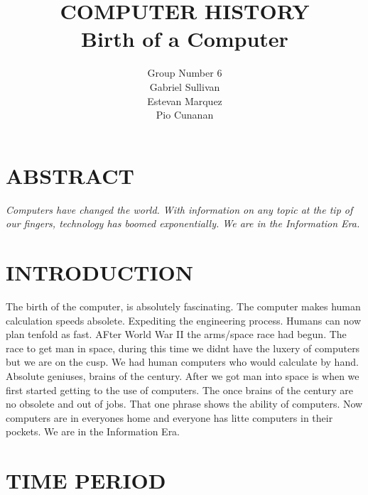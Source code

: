 \documentclass[letterpaper, 10 pt, conference]{IEEEconf}
\title{\LARGE \bf
COMPUTER HISTORY\\
\large Birth of a Computer
}
\author{Group Number 6\\
\small Gabriel Sullivan\\
\small Estevan Marquez\\
\small Pio Cunanan\\
}
\begin{document}
\maketitle
\thispagestyle{empty}
\pagestyle{empty}


\section*{ABSTRACT}
\textit{
Computers have changed the world. With information on any topic at the tip of our fingers, technology has boomed exponentially. We are in the Information Era.  
}

\section{INTRODUCTION}

The birth of the computer, is absolutely fascinating. The computer makes human calculation 
speeds absolete. Expediting the engineering process. Humans can now plan tenfold as fast. 
AFter World War II the arms/space race had begun. The race to get man in space, during this 
time we didnt have the luxery of computers but we are on the cusp. We had human computers who 
would calculate by hand. Absolute geniuses, brains of the century. After we got man into 
space is when we first started getting to the use of computers. The once brains of the 
century are no obsolete and out of jobs. That one phrase shows the ability of computers. Now 
computers are in everyones home and everyone has litte computers in their pockets. We are in 
the Information Era.

\section{TIME PERIOD}
\end{document}
